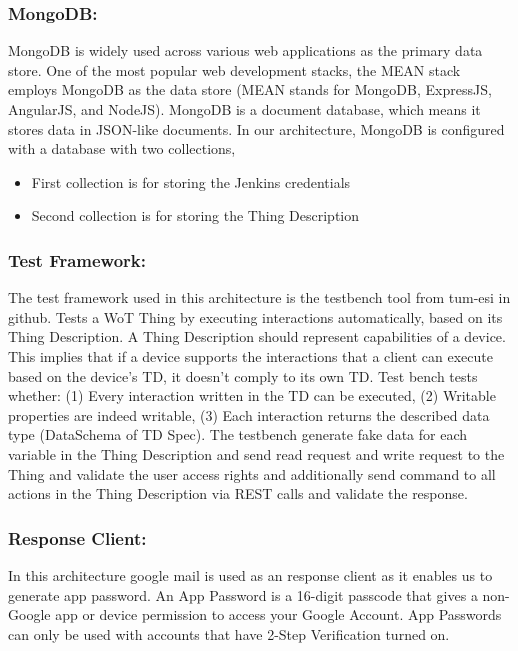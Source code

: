 \documentclass[conference]{IEEEtran}
\theoremstyle{definition}
\begin{document}
\subsubsection{MongoDB:}

MongoDB is widely used across various web applications as the primary data store. 
One of the most popular web development stacks, the MEAN stack employs MongoDB as the data store (MEAN stands for MongoDB, ExpressJS, AngularJS, and NodeJS). 
MongoDB is a document database, which means it stores data in JSON-like documents. 
In our architecture, MongoDB is configured with a database with two collections, 

\begin{itemize}
  \item First collection is for storing the Jenkins credentials
  \item Second collection is for storing the Thing Description
\end{itemize}

\subsubsection{Test Framework: }

The test framework used in this architecture is the testbench tool from tum-esi in github. 
Tests a WoT Thing by executing interactions automatically, based on its Thing Description. A Thing Description should represent capabilities of a device. This implies that if a device supports the interactions that a client can execute based on the device's TD, it doesn't comply to its own TD. Test bench tests whether: (1) Every interaction written in the TD can be executed, (2) Writable properties are indeed writable, (3) Each interaction returns the described data type (DataSchema of TD Spec). The testbench generate fake data for each variable in the Thing Description and send read request and write request to the Thing and validate the user access rights and additionally send command to all actions in the Thing Description via REST calls and validate the response.

\subsubsection{Response Client:}

In this architecture google mail is used as an response client as it enables us to generate app password. 
An App Password is a 16-digit passcode that gives a non-Google app or device permission to access your Google Account. 
App Passwords can only be used with accounts that have 2-Step Verification turned on.
\end{document}
